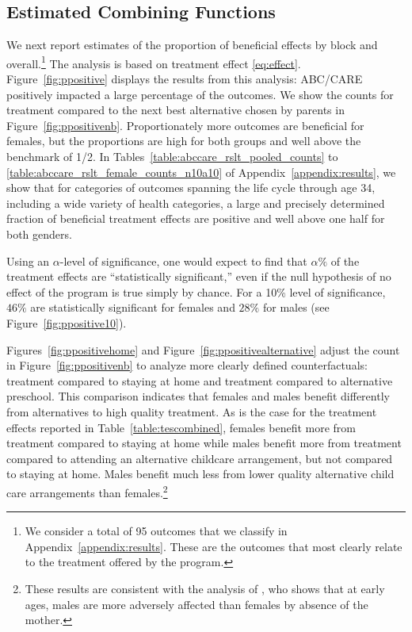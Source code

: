 \subsection{Estimated Combining Functions}

We next report estimates of the proportion of beneficial effects by block and overall.\footnote{We consider a total of 95 outcomes that we classify in Appendix~\ref{appendix:results}. These are the outcomes that most clearly relate to the treatment offered by the program.} The analysis is based on treatment effect \eqref{eq:effect}. Figure~\ref{fig:ppositive} displays the results from this analysis: ABC/CARE positively impacted a large percentage of the outcomes. We show the counts for treatment compared to the next best alternative chosen by parents in Figure~\ref{fig:ppositivenb}. Proportionately more outcomes are beneficial for females, but the proportions are high for both groups and well above the benchmark of 1/2. In Tables~\ref{table:abccare_rslt_pooled_counts} to \ref{table:abccare_rslt_female_counts_n10a10} of Appendix~\ref{appendix:results}, we show that for categories of outcomes spanning the life cycle through age 34, including a wide variety of health categories, a large and precisely determined fraction of beneficial treatment effects are positive and well above one half for both genders.

Using an $\alpha$-level of significance, one would expect to find that $\alpha\%$ of the treatment effects are ``statistically significant,'' even if the null hypothesis of no effect of the program is true simply by chance. For a 10\% level of significance, $46\%$ are statistically significant for females and $28\%$ for males (see Figure~\ref{fig:ppositive10}).

Figures~\ref{fig:ppositivehome} and Figure~\ref{fig:ppositivealternative} adjust the count in Figure~\ref{fig:ppositivenb} to analyze more clearly defined counterfactuals: treatment compared to staying at home and treatment compared to alternative preschool. This comparison indicates that females and males benefit differently from alternatives to high quality treatment. As is the case for the treatment effects reported in Table~\ref{table:tescombined}, females benefit more from treatment compared to staying at home while males benefit more from treatment compared to attending an alternative childcare arrangement, but not compared to staying at home. Males benefit much less from lower quality alternative child care arrangements than females.\footnote{These results are consistent with the analysis of \citet{Rutter_1972_Maternal-Deprivation}, who shows that at early ages, males are more adversely affected than females by absence of the mother.}

